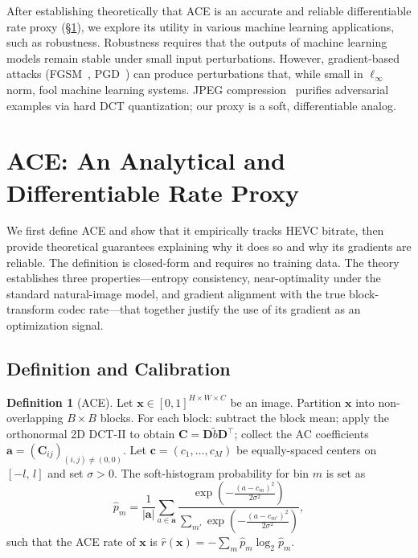 \documentclass{article}
\theoremstyle{definition}
\newtheorem{definition}{Definition}
\newcommand{\bx}{\boldsymbol{x}}
\newcommand{\bc}{\boldsymbol{c}}
\newcommand{\ba}{\boldsymbol{a}}
\newcommand{\bD}{\boldsymbol{D}}
\newcommand{\bC}{\boldsymbol{C}}
\begin{document}
After establishing theoretically that ACE is an accurate and reliable differentiable rate proxy (\S \ref{sec:proxy}), we explore its utility in various machine learning applications, such as robustness.
Robustness requires that the outputs of machine learning models remain stable under small input perturbations.
However, gradient-based attacks (FGSM~\citep{goodfellow2014explaining}, PGD~\citep{madry2017towards}) can produce perturbations that, while small in $\ell_\infty$ norm, fool machine learning systems.
JPEG compression~\citep{guo2018countering} purifies adversarial examples via hard DCT quantization; our proxy is a soft, differentiable analog.

\section{ACE: An Analytical and Differentiable Rate Proxy}
\label{sec:proxy}

We first define ACE and show that it empirically tracks HEVC bitrate, then provide theoretical guarantees explaining why it does so and why its gradients are reliable.
The definition is closed-form and requires no training data.
The theory establishes three properties---entropy consistency, near-optimality under the standard natural-image model, and gradient alignment with the true block-transform codec rate---that together justify the use of its gradient as an optimization signal.

\subsection{Definition and Calibration}
\label{sec:definition}

\begin{definition}[ACE]
\label{def:proxy}
Let $\bx \in [0,1]^{H \times W \times C}$ be an image.
Partition $\bx$ into non-overlapping $B \times B$ blocks.
For each block: subtract the block mean; apply the orthonormal 2D DCT-II to obtain $\bC = \bD\tilde{b}\bD^\top$; collect the AC coefficients $\ba = \left(\bC_{ij}\right)_{(i,j)\neq(0,0)}$.
Let $\bc = (c_1,\ldots,c_M)$ be equally-spaced centers on $[-l,\,l]$ and set $\sigma>0$.
The soft-histogram probability for bin $m$ is set as
\begin{equation*}
  \hat{p}_m = \frac{1}{|\ba|}\sum_{a \in \ba}
    \frac{\exp(-\tfrac{(a-c_m)^2}{2\sigma^2})}
         {\sum_{m'}\exp(-\tfrac{(a-c_{m'})^2}{2\sigma^2})},
\end{equation*}
such that the ACE rate of $\bx$ is $\hat{r}(\bx) = -\sum_{m} \hat{p}_m \log_2 \hat{p}_m$.
\end{definition}
\end{document}
